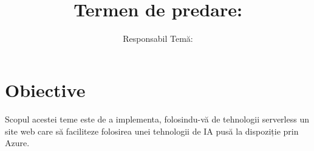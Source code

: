 \documentclass{article}
\title{
\textmd{\textbf{\MNClass \\ \MNTitle}}\\
\normalsize\vspace{0.1in}\small{Termen de predare: \MNDueDate}\\
}
\author{Responsabil Temă: \textbf{\MNAuthorName}}
\date{} %
\begin{document}
\maketitle





\section{Obiective}

Scopul acestei teme este de a implementa, folosindu-vă de tehnologii serverless un site web care să faciliteze folosirea unei tehnologii de IA pusă la dispoziție prin Azure.


\end{document}
